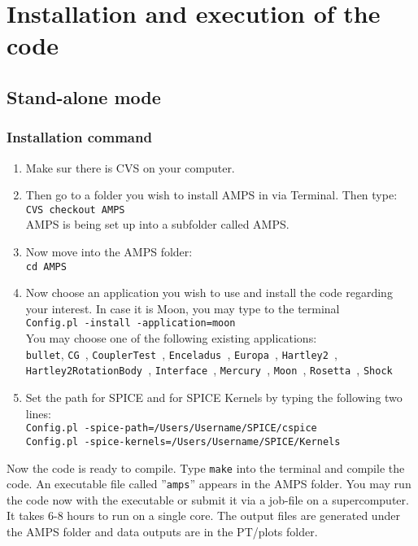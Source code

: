 \chapter{Installation and execution of the code}

\section{Stand-alone mode}

\subsection {Installation command}
\begin{enumerate}
\item Make sur there is CVS on your computer. 
\item Then go to a folder you wish to install AMPS in via Terminal. Then type: \\
{\tt CVS checkout AMPS }\\
AMPS is being set up into a subfolder called AMPS.
\item Now move into the AMPS folder:\\
 {\tt cd AMPS}
\item Now choose an application you wish to use and install the code regarding your interest. In case it is Moon, you may type to the terminal\\ 
{\tt Config.pl -install -application=moon}\\
You may choose one of the following existing applications:\\ 
{\tt  bullet}, {\tt CG }, {\tt CouplerTest }, {\tt Enceladus }, {\tt Europa }, {\tt Hartley2 }, {\tt Hartley2RotationBody }, {\tt Interface }, {\tt Mercury }, {\tt Moon }, {\tt Rosetta }, {\tt Shock}\\
\item Set the path for SPICE and for SPICE Kernels by typing the following two lines:\\
{\tt Config.pl -spice-path=/Users/Username/SPICE/cspice }\\
{\tt Config.pl -spice-kernels=/Users/Username/SPICE/Kernels }
\end{enumerate}
Now the code is ready to compile. Type {\tt make} into the terminal and compile the code. An executable file called ''{\tt amps}'' appears in the AMPS folder. You may run the code now with the executable or submit it via a job-file on a supercomputer. It takes 6-8 hours to run on a single core. The output files are generated under the AMPS folder and data outputs are in the PT/plots folder.

